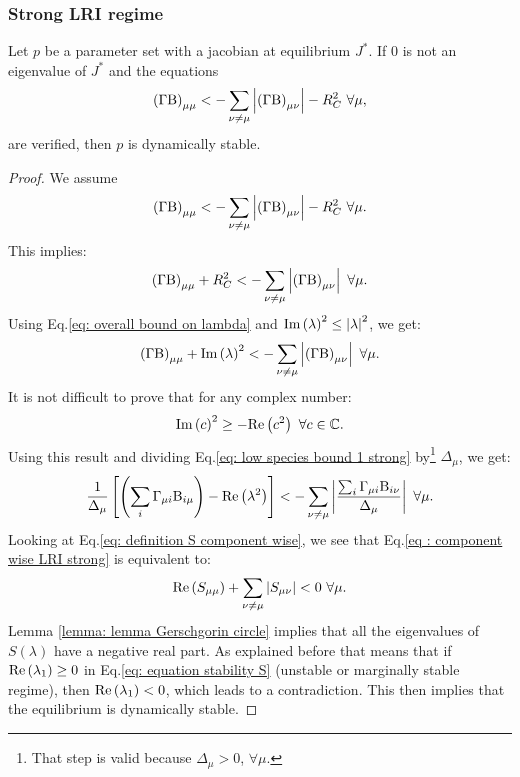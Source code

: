 \documentclass[12pt, titlepage]{report}
\begin{document}
\subsubsection{Strong LRI regime}
\begin{theorem}\label{theorem: strong LRI regime}
Let $p$ be a parameter set with a jacobian at equilibrium $J^*$. If $0$ is not an eigenvalue of $J^*$ and the equations
\begin{equation}
\left(\Gamma \text{B}\right)_{\mu\mu} < - \sum_{\nu \neq \mu } \left|{\left(\Gamma \text{B}\right)_{\mu \nu}}\right| - R_C^2 \ \forall \mu, \label{eq: strong LRI regime}
\end{equation}
are verified, then $p$ is dynamically stable.
\end{theorem}
\begin{proof}
We assume
\begin{equation}
\left(\Gamma \text{B}\right)_{\mu\mu} < - \sum_{\nu \neq \mu } \left|{\left(\Gamma \text{B}\right)_{\mu \nu}}\right| -R_C^2 \ \forall \mu.
\end{equation}
This implies:
\begin{equation}
\left(\Gamma \text{B}\right)_{\mu\mu} + R_C^2< - \sum_{\nu \neq \mu } \left|{\left(\Gamma \text{B}\right)_{\mu \nu}}\right| \ \forall \mu.
\end{equation}
Using Eq.\eqref{eq: overall bound on lambda} and $\text{Im}\left(\lambda\right)^2 \leq \left|{\lambda}\right|^2$, we get:
\begin{equation}
  \left(\Gamma\text{B} \right)_{\mu\mu} + \text{Im}\left(\lambda\right)^2 < - \sum_{\nu \neq \mu } \left|{\left(\Gamma \text{B}\right)_{\mu \nu}}\right| \ \forall \mu. \label{eq: low species bound 1 strong}
\end{equation}
It is not difficult to prove that for any complex number:
\begin{equation}
\imag{c}^2 \geq - \real{c^2} \ \forall c \in \mathbb{C}.
\end{equation}
Using this result and dividing Eq.\eqref{eq: low species bound 1 strong} by\footnote{That step is valid because $\Delta_\mu > 0$, $\forall \mu$.} $\Delta_\mu$, we get:
\begin{equation}
\frac{1}{\Delta_\mu}\left[\left(\sum_i \Gamma_{\mu i} \text{B}_{i \mu} \right)-\text{Re}\left(\lambda^2\right)\right] < - \sum_{\nu \neq \mu } \left|{\frac{\sum_i \Gamma_{\mu i}\text{B}_{i\nu}}{\Delta_\mu}}\right| \ \forall \mu. \label{eq : component wise LRI strong}
\end{equation}
Looking at Eq.\eqref{eq: definition S component wise}, we see that Eq.\eqref{eq : component wise LRI strong} is equivalent to:
\begin{equation}
\text{Re}\left(S_{\mu \mu}\right) + \sum_{\nu \neq \mu} \left|{S_{\mu \nu}}\right| < 0\ \forall \mu.
\end{equation}
Lemma \ref{lemma: lemma Gerschgorin circle} implies that all the eigenvalues of $S(\lambda)$ have a negative real part.
As explained before that means that if $\text{Re}\left(\lambda_1\right) \geq 0 $ in Eq.\eqref{eq: equation stability S} (unstable or marginally stable regime), then $\text{Re}\left(\lambda_1\right) < 0$, which leads to a contradiction. This then implies that the equilibrium is dynamically stable.
\end{proof}
\end{document}
